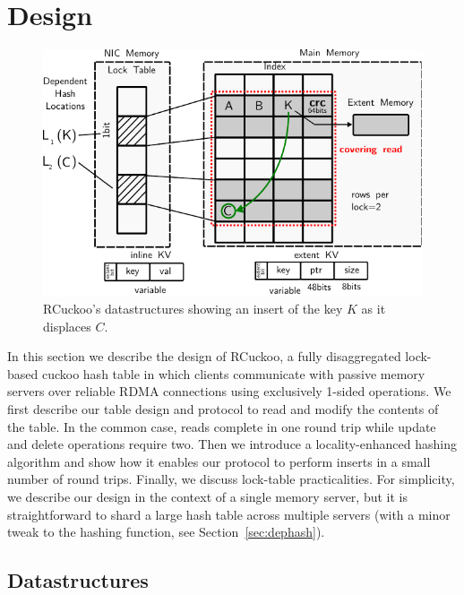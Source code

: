 \section{Design}
\label{sec:design}

\begin{figure}[t]
    \includegraphics[width=0.99\linewidth]{fig/table-diagram.pdf}
    \caption{RCuckoo's datastructures showing an insert of the key $K$ as it displaces $C$.}
    \label{fig:table-diagram}
\end{figure}

In this section we describe the design of RCuckoo, a fully
disaggregated lock-based cuckoo hash table in which clients
communicate with passive memory servers over reliable RDMA connections
using exclusively 1-sided operations.  We first describe our table
design and protocol to read and modify the contents of the table.  In
the common case, reads complete in one round trip while update and
delete operations require two.  Then we introduce a locality-enhanced
hashing algorithm and show how it enables our protocol to perform
inserts in a small number of round trips.  Finally, we discuss
lock-table practicalities.  For simplicity, we describe our design in
the context of a single memory server, but it is straightforward to
shard a large hash table across multiple servers (with a minor tweak
to the hashing function, see Section~\ref{sec:dephash}).

\subsection{Datastructures}
\label{sec:table-design}

